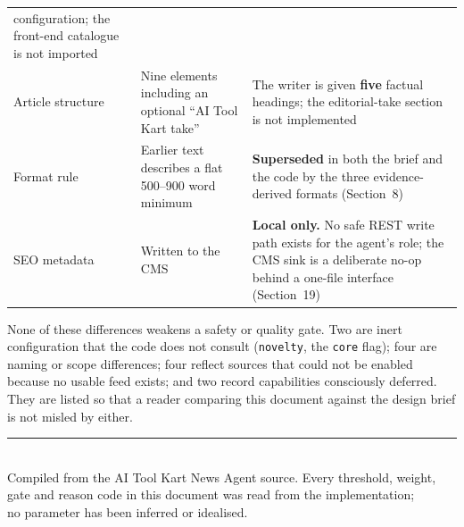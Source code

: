 \documentclass[11pt,a4paper]{article}
\newcommand{\brk}{\hyphenpenalty=0\exhyphenpenalty=0\relax}
\newcommand{\code}[1]{\texttt{\small\brk #1}}
\begin{document}
\begin{center}
\begin{tabularx}{\textwidth}{@{}>{\RaggedRight}p{4.2cm} >{\RaggedRight}p{4.9cm} >{\RaggedRight}X@{}}
  configuration; the front-end catalogue is not imported \\
Article structure & Nine elements including an optional ``AI Tool Kart take'' &
  The writer is given \textbf{five} factual headings; the editorial-take section
  is not implemented \\
Format rule & Earlier text describes a flat 500--900 word minimum &
  \textbf{Superseded} in both the brief and the code by the three evidence-derived
  formats (Section~8) \\
SEO metadata & Written to the CMS & \textbf{Local only.} No safe REST write path
  exists for the agent's role; the CMS sink is a deliberate no-op behind a
  one-file interface (Section~19) \\
\bottomrule
\end{tabularx}
\end{center}

\begin{infobox}
None of these differences weakens a safety or quality gate. Two are inert
configuration that the code does not consult (\code{novelty}, the \code{core}
flag); four are naming or scope differences; four reflect sources that could not
be enabled because no usable feed exists; and two record capabilities
consciously deferred. They are listed so that a reader comparing this document
against the design brief is not misled by either.
\end{infobox}

\vspace{1.6em}
\begin{center}
{\footnotesize\color{aitkGray}
\rule{3cm}{0.4pt}\\[0.6em]
Compiled from the AI Tool Kart News Agent source. Every threshold, weight, gate
and reason code in this document was read from the implementation;\\
no parameter has been inferred or idealised.\par}
\end{center}
\end{document}
